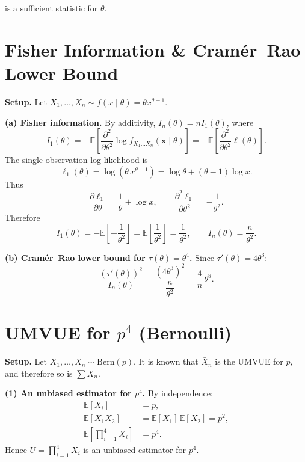 \documentclass{article}
\theoremstyle{plain}
\theoremstyle{definition}
\newcommand{\bbE}{\mathbb{E}}
\begin{document}
is a sufficient statistic for $\theta$.

\section{Fisher Information \& Cram\'er--Rao Lower Bound}

\noindent\textbf{Setup.} Let $X_1,\ldots,X_n\sim
f(x\mid\theta)=\theta x^{\theta-1}$.

\medskip
\noindent\textbf{(a) Fisher information.}
By additivity, $I_n(\theta)=nI_1(\theta)$, where
\[
  I_1(\theta)
  = -\bbE\!\left[\frac{\partial^2}{\partial\theta^2}\log
  f_{X_1 \hdots X_n}(\mathbf{x}\mid\theta)\right]
  = -\bbE\!\left[\frac{\partial^2}{\partial\theta^2}\ell(\theta)\right].
\]
The single-observation log-likelihood is
\[
  \ell_1(\theta) = \log(\theta\,x^{\theta-1}) = \log\theta + (\theta-1)\log x.
\]
Thus
\[
  \frac{\partial\ell_1}{\partial\theta} = \frac{1}{\theta}+\log x,
  \qquad
  \frac{\partial^2\ell_1}{\partial\theta^2} = -\frac{1}{\theta^2}.
\]
Therefore
\[
  I_1(\theta)
  = -\bbE\!\left[-\frac{1}{\theta^2}\right]
  = \bbE\!\left[\frac{1}{\theta^2}\right]
  = \frac{1}{\theta^2},
  \qquad
  I_n(\theta) = \frac{n}{\theta^2}.
\]

\medskip
\noindent\textbf{(b) Cram\'er--Rao lower bound for $\tau(\theta)=\theta^4$.}
Since $\tau'(\theta)=4\theta^3$:
\[
  \frac{(\tau'(\theta))^2}{I_n(\theta)}
  = \frac{(4\theta^3)^2}{\dfrac{n}{\theta^2}}
  = \frac{4}{n}\,\theta^8.
\]

\section{UMVUE for $p^4$ (Bernoulli)}

\noindent\textbf{Setup.} Let $X_1,\ldots,X_n\sim\mathrm{Bern}(p)$.
It is known that $\bar{X}_n$ is the UMVUE for $p$, and therefore so
is $\sum X_n$.

\medskip
\noindent\textbf{(1) An unbiased estimator for $p^4$.}
By independence:
\begin{align*}
  \bbE[X_i] &= p, \\
  \bbE[X_1 X_2] &= \bbE[X_1]\,\bbE[X_2] = p^2, \\
  \bbE\!\left[\prod_{i=1}^{4}X_i\right] &= p^4.
\end{align*}
Hence $U=\prod_{i=1}^{4}X_i$ is an unbiased estimator for $p^4$.
\end{document}
